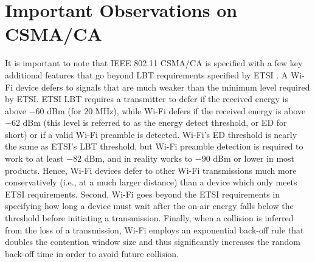 \section{Important Observations on CSMA/CA}
\label{csmaca-obs}

It is important to note that IEEE 802.11 CSMA/CA is specified with a few key additional features that go beyond LBT requirements specified by ETSI \cite{80211}\cite{LBT-ETSI-2014}. A \mbox{Wi-Fi} device defers to signals that are much weaker than the minimum level required by ETSI. ETSI LBT requires a transmitter to defer if the received energy is above $-60$ dBm (for $20$ MHz), while \mbox{Wi-Fi} defers if the received energy is above $-62$ dBm (this level is referred to as the energy detect threshold, or ED for short) or if a valid \mbox{Wi-Fi} preamble is detected. \mbox{Wi-Fi}'s ED threshold is nearly the same as ETSI's LBT threshold, but \mbox{Wi-Fi} preamble detection is required to work to at least $-82$ dBm, and in reality works to $-90$ dBm or lower in most products. Hence, \mbox{Wi-Fi} devices defer to other \mbox{Wi-Fi} transmissions much more conservatively (i.e., at a much larger distance) than a device which only meets ETSI requirements. Second, \mbox{Wi-Fi} goes beyond the ETSI requirements in specifying how long a device must wait after the on-air energy falls below the threshold before initiating a transmission. Finally, when a collision is inferred from the loss of a transmission, \mbox{Wi-Fi} employs an exponential back-off rule that doubles the contention window size and thus significantly increases the random back-off time in order to avoid future collision.

